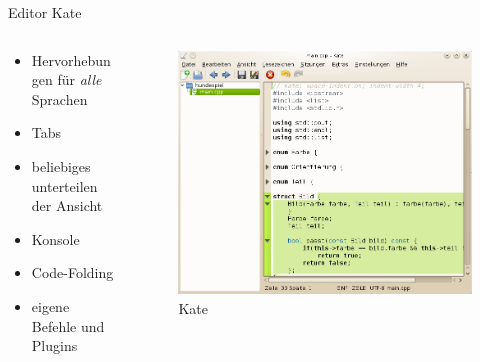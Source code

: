 \begin{frame}{Editor Kate}
  \begin{columns}
    \begin{column}{0.35\textwidth}
      \begin{itemize}
        \item Hervorhebungen für \textit{alle} Sprachen
        \item Tabs
        \item beliebiges unterteilen der Ansicht
        \item Konsole
        \item Code-Folding
        \item eigene Befehle und Plugins
      \end{itemize}
    \end{column}
    \begin{column}{0.65\textwidth}
      \begin{figure}
        \includegraphics[keepaspectratio=true,width=\textwidth]{kate}
        \caption{Kate}
      \end{figure}      
    \end{column}
  \end{columns}
\end{frame}

